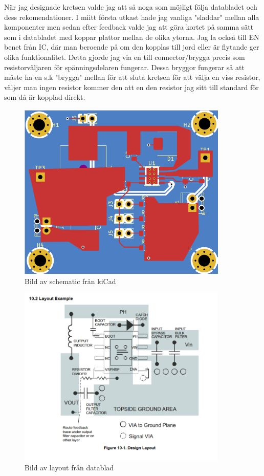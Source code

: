 \documentclass{article}
\begin{document}
När jag designade kretsen valde jag att så noga som möjligt följa databladet och dess
rekomendationer. I miitt första utkast hade jag vanliga "sladdar" mellan alla komponenter
men sedan efter feedback valde jag att göra kortet på samma sätt som i databladet med 
koppar plattor mellan de olika ytorna. Jag la också till EN benet från IC, där man
beroende på om den kopplas till jord eller är flytande ger olika funktionalitet. 
Detta gjorde jag via en till connector/brygga precis som resistorväljaren för
spänningsdelaren fungerar. Dessa bryggor fungerar så att måste ha en s.k "brygga" mellan
för att sluta kretsen för att välja en viss resistor, väljer man ingen resistor kommer den
att en den resistor jag sitt till standard för som då är kopplad direkt.

\begin{figure}[htp]
    \centering
    \includegraphics[width=10cm]{img/nylayout.png}
    \caption{Bild av schematic från kiCad}
\end{figure}

\begin{figure}[htp]
    \centering
    \includegraphics[width=10cm]{img/layout.png}
    \caption{Bild av layout från datablad}
\end{figure}
\end{document}
